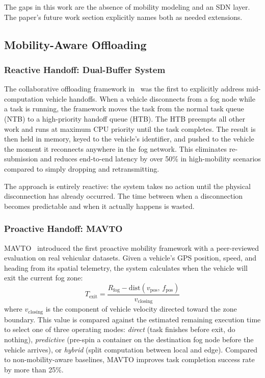 \documentclass[12pt,a4paper]{article}
\begin{document}
The gaps in this work are the absence of mobility modeling and an SDN layer. The
paper's future work section explicitly names both as needed extensions.

\subsection{Mobility-Aware Offloading}

\subsubsection{Reactive Handoff: Dual-Buffer System}

The collaborative offloading framework in~\cite{paper5_mobility} was the first to
explicitly address mid-computation vehicle handoffs. When a vehicle disconnects
from a fog node while a task is running, the framework moves the task from the
normal task queue (NTB) to a high-priority handoff queue (HTB). The HTB preempts
all other work and runs at maximum CPU priority until the task completes. The result
is then held in memory, keyed to the vehicle's identifier, and pushed to the vehicle
the moment it reconnects anywhere in the fog network. This eliminates re-submission
and reduces end-to-end latency by over 50\% in high-mobility scenarios compared to
simply dropping and retransmitting.

The approach is entirely reactive: the system takes no action until the physical
disconnection has already occurred. The time between when a disconnection becomes
predictable and when it actually happens is wasted.

\subsubsection{Proactive Handoff: MAVTO}

MAVTO~\cite{mavto2024} introduced the first proactive mobility framework with
a peer-reviewed evaluation on real vehicular datasets. Given a vehicle's GPS
position, speed, and heading from its spatial telemetry, the system calculates
when the vehicle will exit the current fog zone:
\begin{equation}
  T_\mathrm{exit} = \frac{R_\mathrm{fog} - \mathrm{dist}(v_\mathrm{pos},\,
  f_\mathrm{pos})}{v_\mathrm{closing}}
  \label{eq:texit}
\end{equation}
where $v_\mathrm{closing}$ is the component of vehicle velocity directed toward
the zone boundary. This value is compared against the estimated remaining execution
time to select one of three operating modes: \emph{direct} (task finishes before
exit, do nothing), \emph{predictive} (pre-spin a container on the destination fog
node before the vehicle arrives), or \emph{hybrid} (split computation between
local and edge). Compared to non-mobility-aware baselines, MAVTO improves task
completion success rate by more than 25\%.
\end{document}
